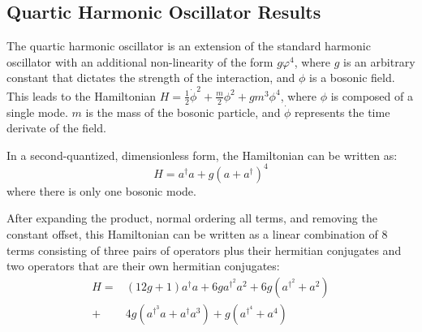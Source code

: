 \subsection{Quartic Harmonic Oscillator Results}
\label{sec:qosc_results}

The quartic harmonic oscillator \cite{PhysRev.184.1231, girguś2024spiralflowquantumquartic, wójcik2012applicationnumericalrenormalizationgroup} is an extension of the standard harmonic oscillator with an additional non-linearity of the form $g \varphi^4$, where $g$ is an arbitrary constant that dictates the strength of the interaction, and $\phi$ is a bosonic field.
This leads to the Hamiltonian $H = \frac12\dot\phi^2 + \frac{m}{2}\phi^2 + gm^3\phi^4 $, where $\phi$ is composed of a single mode.
$m$ is the mass of the bosonic particle, and $\dot \phi$ represents the time derivate of the field.

In a second-quantized, dimensionless form, the Hamiltonian can be written as:
\begin{equation}
    \label{eq:qosc}
    H = a^\dagger a + g\left(a + a^\dagger \right)^4
\end{equation}
where there is only one bosonic mode.

After expanding the product, normal ordering all terms, and removing the constant offset, this Hamiltonian can be written as a linear combination of $8$ terms consisting of three pairs of operators plus their hermitian conjugates and two operators that are their own hermitian conjugates:
\begin{equation}
    \begin{split}
        H = &(12g + 1) a^\dagger a + 6g a^{\dagger^2} a^2 + 6g \left(a^{\dagger^2} + a^2 \right) \\
        + &4g \left(a^{\dagger^3} a + a^\dagger a^3 \right) + g \left(a^{\dagger^4} + a^4 \right)
    \end{split}
\end{equation}


